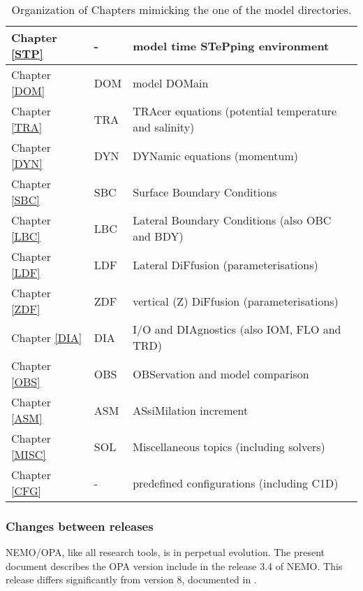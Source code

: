\begin{table}[!t]	
\caption{ \label{Tab_chap}   Organization of Chapters mimicking the one of the model directories. }
\begin{center} 	\begin{tabular}{|l|l|l|}	\hline
Chapter \ref{STP}	& -   		        & model time STePping environment \\		\hline
Chapter \ref{DOM}	& DOM		& model DOMain \\		\hline
Chapter \ref{TRA}	& TRA		& TRAcer equations (potential temperature and salinity) \\   \hline
Chapter \ref{DYN}	& DYN		& DYNamic equations (momentum) \\		\hline
Chapter \ref{SBC} 	& SBC		& Surface Boundary Conditions \\			\hline
Chapter \ref{LBC}	& LBC		& Lateral Boundary Conditions (also OBC and BDY)  \\ 		\hline
Chapter \ref{LDF}	& LDF		& Lateral DiFfusion (parameterisations) \\	\hline
Chapter \ref{ZDF}	& ZDF		& vertical (Z) DiFfusion (parameterisations)  \\		\hline
Chapter \ref{DIA}	& DIA		& I/O and DIAgnostics (also IOM, FLO and TRD) \\		\hline
Chapter \ref{OBS}	& OBS		& OBServation and model comparison  \\		\hline
Chapter \ref{ASM}	& ASM		& ASsiMilation increment  \\		\hline
Chapter \ref{MISC}	& SOL		& Miscellaneous  topics (including solvers)  \\       \hline
Chapter \ref{CFG}	&  - 			& predefined configurations (including C1D) \\		\hline
\end{tabular} 	
\end{center}	\end{table}


\subsubsection{Changes between releases}
NEMO/OPA, like all research tools, is in perpetual evolution. The present document describes 
the OPA version include in the release 3.4 of NEMO.  This release differs significantly
from version 8, documented in \citet{Madec1998}.\\

